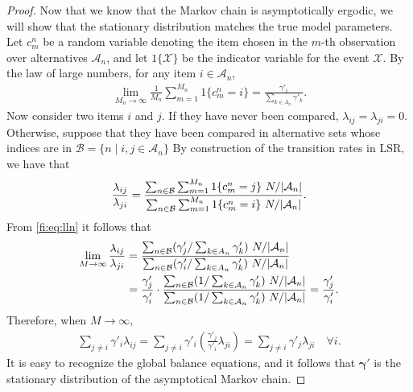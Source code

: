 \begin{proof}
Now that we know that the Markov chain is asymptotically ergodic, we will show that the stationary distribution matches the true model parameters.
Let $c^n_m$ be a random variable denoting the item chosen in the $m$-th observation over alternatives $\mathcal{A}_n$, and let
$1\{\mathcal{X}\}$ be the indicator variable for the event $\mathcal{X}$.
By the law of large numbers, for any item $i \in \mathcal{A}_n$,
\begin{align}
\label{fi:eq:lln}
\lim_{M_n \to \infty} \frac{1}{M_n} \sum_{m = 1}^{M_n} 1\{c^n_m = i\} = \frac{\gamma'_i}{\sum_{k \in A_n} \gamma'_k}.
\end{align}
Now consider two items $i$ and $j$.
If they have never been compared, $\lambda_{ij} = \lambda_{ji} = 0$.
Otherwise, suppose that they have been compared in alternative sets whose indices are in $\mathcal{B} = \{ n \mid i, j \in \mathcal{A}_n \}$
By construction of the transition rates in LSR, we have that
\begin{align*}
\frac{\lambda_{ij}}{\lambda_{ji}}
= \frac{\sum_{n \in \mathcal{B}} \sum_{m = 1}^{M_n} 1\{c^n_m = j\} \ N / \lvert \mathcal{A}_n \rvert}
       {\sum_{n \in \mathcal{B}} \sum_{m = 1}^{M_n} 1\{c^n_m = i\} \ N / \lvert \mathcal{A}_n \rvert}.
\end{align*}
From \eqref{fi:eq:lln} it follows that
\begin{align*}
\lim_{M \to \infty}\frac{\lambda_{ij}}{\lambda_{ji}}
& = \frac{\sum_{n \in \mathcal{B}} (\gamma'_j / \sum_{k \in A_n} \gamma'_k) \ N / \lvert \mathcal{A}_n \rvert}
         {\sum_{n \in \mathcal{B}} (\gamma'_i / \sum_{k \in A_n} \gamma'_k) \ N / \lvert \mathcal{A}_n \rvert} \\
& = \frac{\gamma'_j }{\gamma'_i}
    \cdot \frac{\sum_{n \in \mathcal{B}}(1 / \sum_{k \in \mathcal{A}_n} \gamma'_k) \ N / \lvert \mathcal{A}_n \rvert}
               {\sum_{n \in \mathcal{B}}(1 / \sum_{k \in \mathcal{A}_n} \gamma'_k) \ N / \lvert \mathcal{A}_n \rvert}
  = \frac{\gamma'_j }{\gamma'_i}.
\end{align*}
Therefore, when $M \to \infty$,
\begin{align*}
\sum_{j \ne i} \gamma'_i \lambda_{ij} = \sum_{j \ne i} \gamma'_i \left( \frac{\gamma'_j}{\gamma'_i} \lambda_{ji} \right)
                                    = \sum_{j \ne i} \gamma'_j \lambda_{ji}  \quad \forall i.
\end{align*}
It is easy to recognize the global balance equations, and it follows that $\bm{\gamma}'$ is the stationary distribution of the asymptotical Markov chain.
\end{proof}

